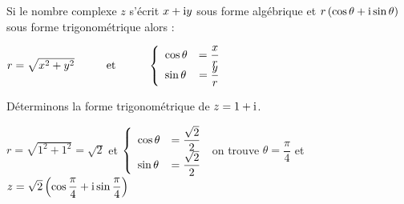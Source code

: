   
  \medskip
  
  Si le nombre complexe $ z $ s'écrit   $ x+\text{i} y $ sous  forme algébrique  et $ r\left(\cos \theta +\text{i} \sin \theta\right)$   sous forme trigonométrique alors :
  
  
   $ r=\sqrt{x^2+y^2} 
  \hspace*{1cm}  \text{et}  \hspace*{1cm}   \left\{\begin{array}{l c l}
\cos \theta & = \dfrac{x}{r} \\ 	 
\sin \theta & = \dfrac{y}{r}
\end{array}\right. $
 
  
  
  \begin{example}
  
   Déterminons la forme trigonométrique  de $ z=1+\text{i} $.
  
  \medskip
  $ r=\sqrt{1^2+1^2}=\sqrt{2} $  \hspace*{0.5cm}  et  \hspace*{0.5cm} $  \left\{\begin{array}{l c l}
\cos \theta & = \dfrac{\sqrt{2}}{2} \\ 	 
\sin \theta & = \dfrac{\sqrt{2}}{2}
\end{array}\right. $  on trouve $ \theta=\dfrac{\pi}{4} $ \; et\; $ z=\sqrt{2}\left(\cos \dfrac{\pi}{4} +\text{i} \sin \dfrac{\pi}{4}\right)$
\end{example}

\medskip


